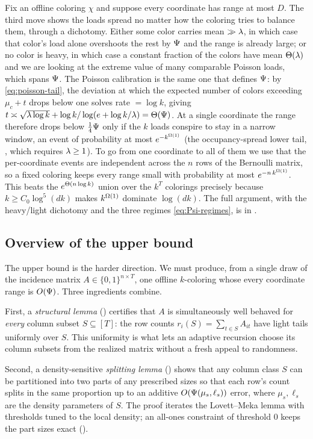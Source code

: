 Fix an offline coloring $\chi$ and suppose every coordinate has range at most $D$. The third move shows the loads spread no
matter how the coloring tries to balance them, through a dichotomy. Either some color carries mean $\gg\lambda$, in which case
that color's load alone overshoots the rest by $\Psi$ and the range is already large; or no color is heavy, in which case
a constant fraction of the colors have mean $\Theta(\lambda)$ and we are looking at the extreme value of many comparable Poisson
loads, which spans $\Psi$. The Poisson calibration is the same one that defines $\Psi$: by \eqref{eq:poisson-tail}, the
deviation at which the expected number of colors exceeding $\mu_c+t$ drops below one solves rate $=\log k$, giving
$t\asymp\sqrt{\lambda\log k}+\log k/\log(e+\log k/\lambda)=\Theta(\Psi)$. At a single coordinate the range therefore drops below
$\tfrac14\Psi$ only if the $k$ loads conspire to stay in a narrow window, an event of probability at most $e^{-k^{\Omega(1)}}$
(the occupancy-spread lower tail, , which requires $\lambda\ge1$). To go from one coordinate to all of them
we use that the per-coordinate events are independent across the $n$ rows of the Bernoulli matrix, so a fixed coloring
keeps every range small with probability at most $e^{-n\,k^{\Omega(1)}}$. This beats the $e^{\Theta(n\log k)}$ union over the
$k^T$ colorings precisely because $k\ge C_0\log^5(dk)$ makes $k^{\Omega(1)}$ dominate $\log(dk)$. The full argument, with the
heavy/light dichotomy and the three regimes \eqref{eq:Psi-regimes}, is in .

\subsection{Overview of the upper bound}\label{sec:offline-overview}

The upper bound is the harder direction. We must produce, from a single draw of the incidence matrix $A\in\{0,1\}^{n\times T}$,
one offline $k$-coloring whose every coordinate range is $O(\Psi)$. Three ingredients combine.

First, a \emph{structural lemma} () certifies that $A$ is simultaneously well behaved for
\emph{every} column subset $S\subseteq[T]$: the row counts $r_i(S)=\sum_{t\in S}A_{it}$ have light tails uniformly over
$S$. This uniformity is what lets an adaptive recursion choose its column subsets from the realized matrix without a fresh
appeal to randomness.

Second, a density-sensitive \emph{splitting lemma} () shows that any column class $S$ can be partitioned
into two parts of any prescribed sizes so that each row's count splits in the same proportion up to an additive
$O(\Psi(\mu_s,\ell_s))$ error, where $\mu_s,\ell_s$ are the density parameters of $S$. The proof iterates the
Lovett--Meka lemma with thresholds tuned to the local density; an all-ones constraint of threshold $0$ keeps the part sizes
exact ().

